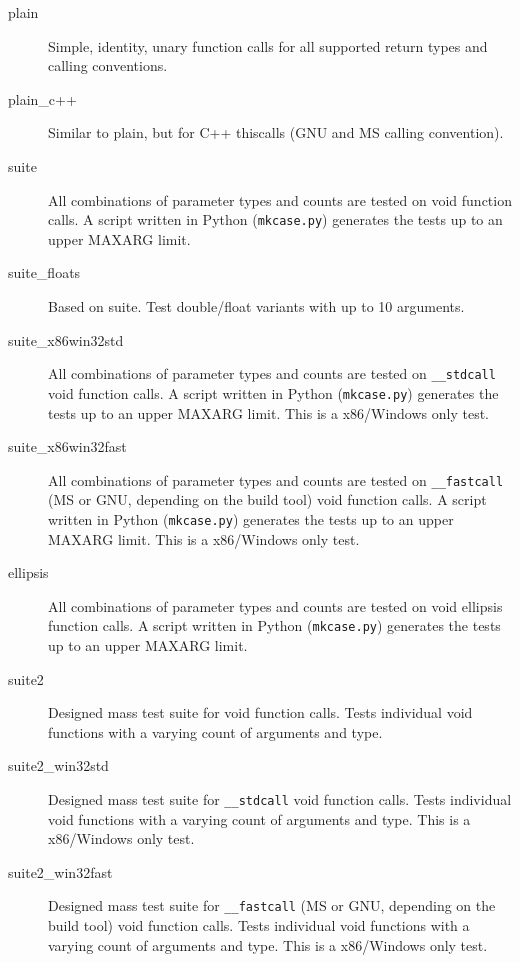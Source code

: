\begin{description}

\item [plain] 
Simple, identity, unary function calls for all supported return types and
calling conventions.

\item [plain\_c++] 
Similar to plain, but for C++ thiscalls (GNU and MS calling convention).

\item [suite] 
All combinations of parameter types and counts are tested on void function
calls. A script written in Python ({\tt mkcase.py}) generates the tests up to
an upper MAXARG limit.

\item [suite\_floats]
Based on suite. Test double/float variants with up to 10 arguments.

\item [suite\_x86win32std] 
All combinations of parameter types and counts are tested on {\tt \_\_stdcall}
void function calls. A script written in Python ({\tt mkcase.py}) generates
the tests up to an upper MAXARG limit. This is a x86/Windows only test.

\item [suite\_x86win32fast] 
All combinations of parameter types and counts are tested on {\tt \_\_fastcall}
(MS or GNU, depending on the build tool) void function calls.
A script written in Python ({\tt mkcase.py}) generates the tests up to
an upper MAXARG limit. This is a x86/Windows only test.

\item [ellipsis]
All combinations of parameter types and counts are tested on void ellipsis 
function calls. A script written in Python ({\tt mkcase.py}) generates the 
tests up to an upper MAXARG limit.

\item [suite2]
Designed mass test suite for void function calls.
Tests individual void functions with a varying count of arguments and type.

\item [suite2\_win32std]
Designed mass test suite for {\tt \_\_stdcall} void function calls.
Tests individual void functions with a varying count of arguments and type.
This is a x86/Windows only test.

\item [suite2\_win32fast]
Designed mass test suite for {\tt \_\_fastcall} (MS or GNU, depending on the build tool) void function calls.
Tests individual void functions with a varying count of arguments and type.
This is a x86/Windows only test.


\end{description}
